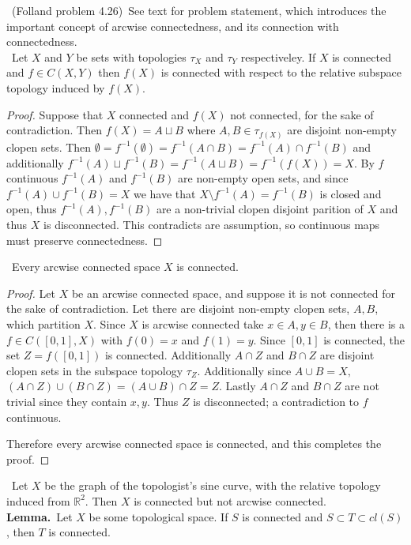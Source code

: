 \documentclass[11pt]{amsart}
\theoremstyle{definition}
\numberwithin{theorem}{section}
\numberwithin{definition}{section}
\numberwithin{equation}{section}
\begin{document}
\medskip {}\ (Folland problem 4.26)\ 
See text for problem statement, which introduces the
important concept of arcwise connectedness, and its connection with connectedness. \\
\noindent {\bf (a)}\ Let $X$ and $Y$ be sets with topologies $\tau_X$ and $\tau_Y$ respectiveley.
If $X$ is connected and $f \in C(X,Y)$ then $f(X)$ is connected with respect to the relative subspace topology
induced by $f(X)$.
\begin{proof}
	Suppose that $X$ connected and $f(X)$ not connected, for the sake of contradiction. Then $f(X) = A \sqcup B$ where $A, B \in \tau_{f(X)}$ are disjoint non-empty clopen sets. Then $\emptyset = f^{-1}(\emptyset) = f^{-1}(A \cap B) = f^{-1}(A) \cap f^{-1}(B)$ and additionally $f^{-1}(A) \sqcup f^{-1}(B) = f^{-1}(A \sqcup B) = f^{-1}(f(X)) = X$. By $f$ continuous $f^{-1}(A)$ and $f^{-1}(B)$ are non-empty open sets, and since $f^{-1}(A) \cup f^{-1}(B) = X$ we have that $X \setminus f^{-1}(A) = f^{-1}(B)$ is closed and open, thus $f^{-1}(A), f^{-1}(B)$ are a non-trivial clopen disjoint parition of $X$  and thus $X$ is disconnected. This contradicts are assumption, so continuous maps must preserve connectedness.
\end{proof}
\ Every arcwise connected space $X$ is connected.
\begin{proof} 
 	Let $X$ be an arcwise connected space, and suppose it is not connected for the sake of contradiction. 
 	Let there are disjoint non-empty clopen sets, $A, B$, which partition $X$. Since $X$ is arcwise connected take $x \in A, y\in B$, then there is a $f \in C([0,1], X)$ with $f(0) = x $ and $f(1) = y$. Since $[0,1]$ is connected, the set $Z = f([0,1])$ is connected. Additionally $A \cap Z$ and $B \cap Z$ are disjoint clopen sets in the subspace topology $\tau_Z$. Additionally since $A \cup B = X,$ $(A \cap Z)\cup (B \cap Z) = (A\cup B) \cap Z= Z$. Lastly $A \cap Z$ and $B \cap Z$ are not trivial since they contain $x, y$. Thus $Z$ is disconnected; a contradiction to $f$ continuous. 

 	Therefore every arcwise connected space is connected, and this completes the proof.
 \end{proof} 
\medskip{}\  Let $X$ be the graph of the topologist's sine curve, with the relative topology induced from $\mathbb{R}^2$. Then $X$ is connected but not arcwise connected.\\[0.5cm]
\textbf{Lemma.}\ 
	Let $X$ be some topological space. If $S$ is connected and $S \subset T \subset cl(S)$, then $T$ is connected.
\end{document}
